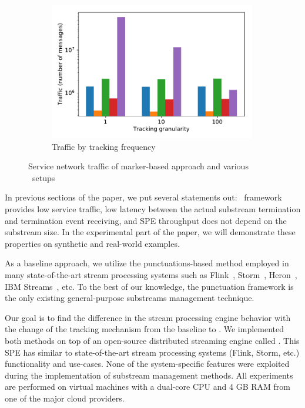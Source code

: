 \begin{figure}[t!]
\begin{subfigure}[b]{0.32\textwidth}
            \includegraphics[width=0.99\textwidth]{pics/traffic_by_tracking_frequency_bars.pdf}
            \caption{Traffic by tracking frequency}
            \label{traffic_granularity}
    \end{subfigure}
    \caption{Service network traffic of marker-based approach and various \tracker\ setups}
    \label{traffic_plots}
\end{figure}
In previous sections of the paper, we put several statements out: \tracker\ framework provides low service traffic, low latency between the actual substream termination and termination event receiving, and SPE throughput does not depend on the substream size. In the experimental part of the paper, we will demonstrate these properties on synthetic and real-world examples. 

As a baseline approach, we utilize the punctuations-based method employed in many state-of-the-art stream processing systems such as Flink~\cite{Carbone:2017:SMA:3137765.3137777}, Storm~\cite{apache:storm:state}, Heron~\cite{Kulkarni:2015:THS:2723372.2742788}, IBM Streams~\cite{jacques2016consistent}, etc. To the best of our knowledge, the punctuation framework is the only existing general-purpose substreams management technique.

Our goal is to find the difference in the stream processing engine behavior with the change of the tracking mechanism from the baseline to \tracker. We implemented both methods on top of an open-source distributed streaming engine called \FlameStream. This SPE has similar to state-of-the-art stream processing systems (Flink, Storm, etc.) functionality and use-cases. None of the system-specific features were exploited during the implementation of substream management methods. All experiments are performed on virtual machines with a dual-core CPU and 4 GB RAM from one of the major cloud providers. 

